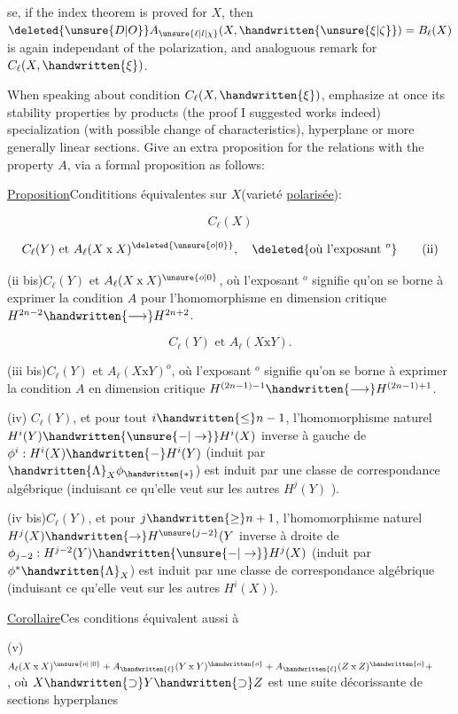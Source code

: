%
se, if the index theorem is proved for $X$, then $\deleted{\unsure{D|O}}A_{\unsure{\ell|l|\chi}}(X,\handwritten{\unsure{\xi|\zeta}})=B_{\ell}(X)$ is again
independant of the polarization, and analoguous remark for $C_{\ell}(X,\handwritten{\xi})$.

When speaking about condition $C_{\ell}(X,\handwritten{\xi})$, emphasize at once its stability
properties by products (the proof I suggested works indeed) specialization
(with possible change of characteristics), hyperplane or more generally
linear sections. Give an extra proposition for the relations with the
property $A$, via a formal proposition as follows:

\uline{Proposition}\quad Condititions équivalentes sur $X$(varieté \uline{polarisée}):

\[
C_{\ell}(X) \tag*{(i)}
\]

\[
C_{\ell}(Y)\text{ et }A_{\ell}(X\mathbin{\mathrm{x}}X)^{\deleted{\unsure{o|0}}},\quad
\deleted{\text{où l'exposant }{}^{o}} \tag*{(ii)}
\]

(ii bis)\quad $C_{\ell}(Y)$ et $A_{\ell}(X\mathbin{\mathrm{x}}X)^{\unsure{o|0}}$, où l'exposant $^{o}$ signifie qu'on se borne
à exprimer la condition $A$ pour l'homomorphisme en dimension critique
$H^{2n-2}\handwritten{\longrightarrow}H^{2n+2}$.

\[
C_{\ell}(Y)\text{ et }A_{\ell}(X\mathbin{\mathrm{x}}Y). \tag*{(iii)}
\]

(iii bis)\quad $C_{\ell}(Y)$ et $A_{\ell}(X\mathbin{\mathrm{x}}Y)^{o}$, où l'exposant $^{o}$ signifie qu'on se borne
à exprimer la condition $A$ en dimension critique $H^{(2n-1)-1}\handwritten{\longrightarrow}H^{(2n-1)+1}$.

(iv)\quad {} $C_{\ell}(Y)$, et pour tout $i\handwritten{\leq} n-1$, l'homomorphisme
naturel $H^{i}(Y)\handwritten{\unsure{-|\to}}H^{i}(X)$ inverse à gauche de $\phi^{i}:H^{i}(X)\handwritten{-}H^{i}(Y)$ (induit
par $\handwritten{\Lambda}_{X}\phi_{\handwritten{*}}$) est induit par une classe de correspondance algébrique (induisant ce qu'elle veut sur les autres $H^{j}(Y)$ ).

(iv bis)\quad $C_{\ell}(Y)$, et pour $j\handwritten{\geq} n+1$, l'homomorphisme naturel $H^{j}(X)\handwritten{\to}H^{\unsure{j-2}}(Y$
inverse à droite de $\phi_{j-2}:H^{j-2}(Y)\handwritten{\unsure{-|\to}}H^{j}(X)$  (induit par $\phi^{*}\handwritten{\Lambda}_{X}$) est
induit par une classe de correspondance algébrique (induisant ce qu'elle
veut sur les autres $H^{i}(X)$).

\uline{Corollaire}\quad {}Ces conditions équivalent aussi à

(v)\quad $A_{\ell}(X\mathbin{\mathrm{x}}X)^{\unsure{o|\,|0}}+A_{\handwritten{\ell}}(Y\mathbin{\mathrm{x}}Y)^{\handwritten{o}}+A_{\handwritten{\ell}}(Z\mathbin{\mathrm{x}}Z)^{\handwritten{o}}+\hspace{2em}$, où $X\handwritten{\supset}Y\handwritten{\supset}Z$ est une
suite décorissante de sections hyperplanes

